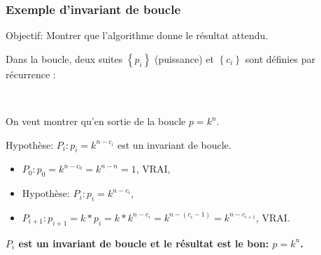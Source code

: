 \begin{frame}[fragile]
\frametitle{Exemple d'invariant de boucle}
Objectif: Montrer que l'algorithme donne le résultat attendu.

Dans la boucle, deux suites $\left\{p_i \right\}$ (puissance) et $\left\{c_i \right\}$ sont définies par récurrence :


~\

On veut montrer qu'en sortie de la boucle $p=k^n$.

Hypothèse: $P_i:p_i=k^{n-c_i}$ est un invariant de boucle.

\begin{itemize}
 \item $P_0:p_0=k^{n-c_0}=k^{n-n}=1$, VRAI,
 \item Hypothèse: $P_i:p_i=k^{n-c_i}$,
 \item $P_{i+1}:p_{i+1}=k*p_i=k*k^{n-c_i}=k^{n-(c_i-1)}=k^{n-c_{i+1}}$, VRAI.
\end{itemize}

\textbf{$P_i$ est un invariant de boucle et le résultat est le bon: $p=k^n$.}
\end{frame}


